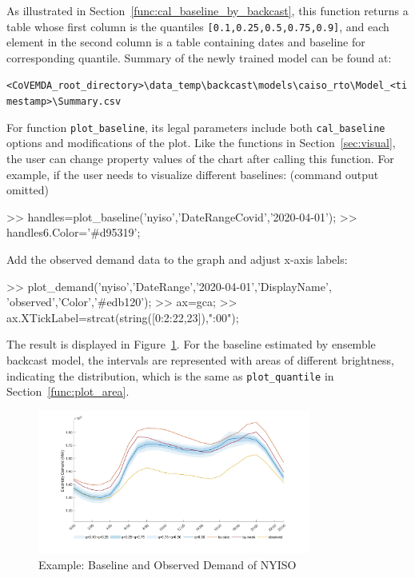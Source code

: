 \documentclass[10pt]{article}
\numberwithin{equation}{section}
\numberwithin{table}{section}
\numberwithin{figure}{section}
\begin{document}
As illustrated in Section~\ref{func:cal_baseline_by_backcast}, this function returns a table whose first column is the quantiles \verb![0.1,0.25,0.5,0.75,0.9]!, and each element in the second column is a table containing dates and baseline for corresponding quantile. Summary of the newly trained model can be found at:
\begin{center}
    \verb!<CoVEMDA_root_directory>\data_temp\backcast\models\caiso_rto\Model_<timestamp>\Summary.csv!
\end{center}

For function \verb!plot_baseline!, its legal parameters include both \verb!cal_baseline! options and modifications of the plot. Like the functions in Section~\ref{sec:visual}, the user can change property values of the chart after calling this function. For example, if the user needs to visualize different baselines: (command output omitted)

\begin{Command}
>> handles=plot_baseline('nyiso','DateRangeCovid','2020-04-01');
>> handles{6}.Color='#d95319';
\end{Command}

Add the observed demand data to the graph and adjust x-axis labels:

\begin{Command}
>> plot_demand('nyiso','DateRange','2020-04-01','DisplayName',
   'observed','Color','#edb120');
>> ax=gca;
>> ax.XTickLabel=strcat(string([0:2:22,23]),":00");
\end{Command}

The result is displayed in Figure~\ref{fig:baseline_eg1}. For the baseline estimated by ensemble backcast model, the intervals are represented with areas of different brightness, indicating the distribution, which is the same as \verb!plot_quantile! in Section~\ref{func:plot_area}.

\begin{figure}[htbp]
  \centering
  \noindent\includegraphics[width=0.8\textwidth]{figures/baseline_example1.jpg}
  \caption{Example: Baseline and Observed Demand of NYISO} \label{fig:baseline_eg1}
\end{figure}
\end{document}
